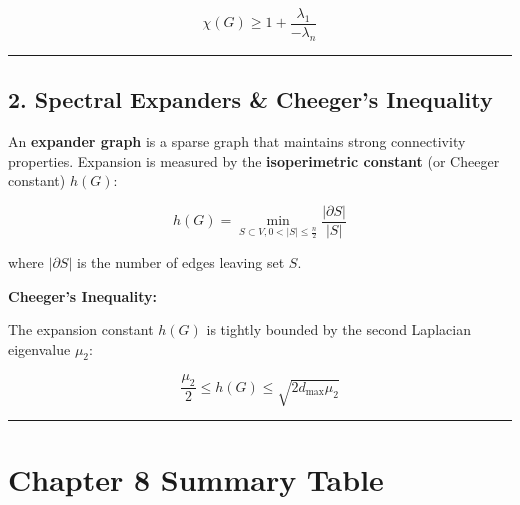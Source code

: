 \documentclass[
]{book}
\theoremstyle{definition}
\theoremstyle{definition}
\theoremstyle{definition}
\theoremstyle{definition}
\theoremstyle{remark}
\begin{document}
\[\chi(G) \ge 1 + \frac{\lambda_1}{-\lambda_n}\]

\begin{center}\rule{0.5\linewidth}{0.5pt}\end{center}

\subsection{2. Spectral Expanders \& Cheeger's Inequality}\label{spectral-expanders-cheegers-inequality}

An \textbf{expander graph} is a sparse graph that maintains strong connectivity properties. Expansion is measured by the \textbf{isoperimetric constant} (or Cheeger constant) \(h(G)\):

\[h(G) = \min_{S \subset V, 0 < \vert{}S\vert{} \le \frac{n}{2}} \frac{\vert{}\partial S\vert{}}{\vert{}S\vert{}}\]

where \(\vert{}\partial S\vert{}\) is the number of edges leaving set \(S\).

\textbf{Cheeger's Inequality:}

The expansion constant \(h(G)\) is tightly bounded by the second Laplacian eigenvalue \(\mu_2\):

\[\frac{\mu_2}{2} \le h(G) \le \sqrt{2 d_{\max} \mu_2}\]

\begin{center}\rule{0.5\linewidth}{0.5pt}\end{center}

\section{Chapter 8 Summary Table}\label{chapter-8-summary-table}
\end{document}
